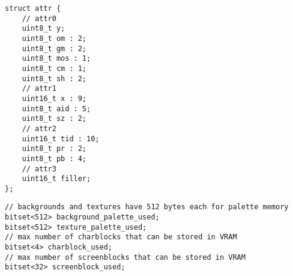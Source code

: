 \begin{lstlisting}[float,caption={\texttt{Struct} com \texttt{bitfields} para atributos das texturas.}]
struct attr {
    // attr0
    uint8_t y;
    uint8_t om : 2;
    uint8_t gm : 2;
    uint8_t mos : 1;
    uint8_t cm : 1;
    uint8_t sh : 2;
    // attr1
    uint16_t x : 9;
    uint8_t aid : 5;
    uint8_t sz : 2;
    // attr2
    uint16_t tid : 10;
    uint8_t pr : 2;
    uint8_t pb : 4;
    // attr3
    uint16_t filler;
};
\end{lstlisting}

\begin{lstlisting}[float,caption={\textit{Bitsets} para checagem de disponibilidade na memória.}]
// backgrounds and textures have 512 bytes each for palette memory
bitset<512> background_palette_used;
bitset<512> texture_palette_used;
// max number of charblocks that can be stored in VRAM
bitset<4> charblock_used;
// max number of screenblocks that can be stored in VRAM
bitset<32> screenblock_used;
\end{lstlisting}
